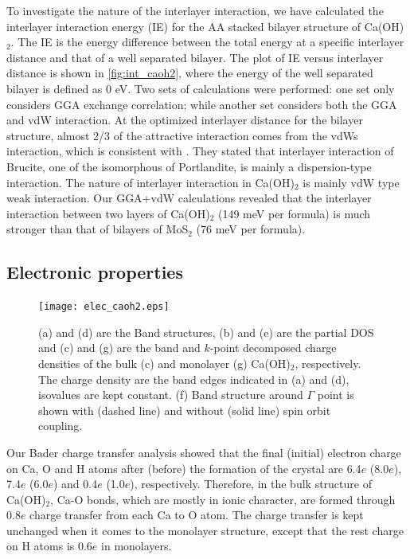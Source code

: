 To investigate the nature of the interlayer interaction, we 
have calculated the interlayer interaction energy (IE) for the AA stacked 
bilayer structure of Ca(OH)$_2$. The IE is the energy difference between the 
total energy at a specific interlayer distance and that of a well
separated bilayer. The plot of IE versus interlayer distance is shown in \autoref{fig:int_caoh2}, where the energy of the  well separated bilayer is defined as 
0 eV. Two sets of calculations were performed: one set only considers GGA 
exchange correlation; while another set considers both the GGA and vdW 
interaction. At the optimized interlayer distance for the bilayer structure, 
almost 2/3 of the attractive interaction comes from the vdWs 
interaction, which is consistent with \citet{DArco1993} . They stated that
interlayer interaction of Brucite, one of the isomorphous of Portlandite, is
mainly a dispersion-type interaction. The nature of interlayer interaction in Ca(OH)$_2$ is mainly vdW type weak interaction. Our GGA+vdW calculations revealed that the interlayer interaction between two layers of Ca(OH)$_2$ (149 meV per formula) is much stronger than that of bilayers of MoS$_2$ (76 meV per formula).


\subsection{Electronic properties}\label{sec:electronic}

\begin{figure}[htbp]
\centering
\texttt{[image: elec\_caoh2.eps]}
\caption{\label{fig:elec_caoh2} (a) and (d) are the Band structures, 
(b) and (e) are the partial DOS and (c) and (g) are the band and $k$-point decomposed charge densities of the bulk (c) and monolayer (g) Ca(OH)$_2$, respectively. The charge density are the band edges indicated in (a) and (d), isovalues are kept constant. (f) Band structure around $\Gamma$ point is shown with (dashed line) and without (solid line) spin orbit coupling. }
\end{figure}

Our Bader charge transfer analysis showed that the final (initial) electron 
charge on Ca, O and H atoms after (before) the formation of the crystal are 
6.4$e$ (8.0$e$), 7.4$e$ (6.0$e$) and 0.4$e$ (1.0$e$), respectively. Therefore, 
in the bulk structure of Ca(OH)$_2$, Ca-O bonds, which are 
mostly in ionic character, are formed through 0.8$e$ charge transfer 
from each Ca to O atom.  The charge transfer is kept unchanged when it comes to the monolayer structure, except that the rest charge on H atoms is 0.6$e$ in monolayers.

